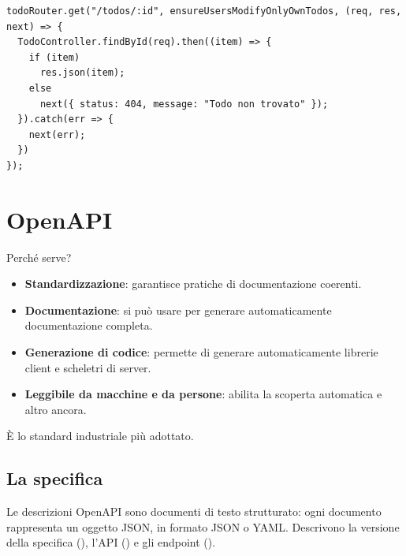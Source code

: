 \begin{lstlisting}[style=js, name=routes/todoRouter.js]
todoRouter.get("/todos/:id", ensureUsersModifyOnlyOwnTodos, (req, res, next) => {
  TodoController.findById(req).then((item) => {
    if (item)
      res.json(item);
    else
      next({ status: 404, message: "Todo non trovato" });
  }).catch(err => {
    next(err);
  })
});
\end{lstlisting}


\section{OpenAPI}


Perché serve?

\begin{itemize}
  \item \textbf{Standardizzazione}: garantisce pratiche di documentazione
        coerenti.
  \item \textbf{Documentazione}: si può usare per generare automaticamente
        documentazione completa.
  \item \textbf{Generazione di codice}: permette di generare automaticamente
        librerie client e scheletri di server.
  \item \textbf{Leggibile da macchine e da persone}: abilita la scoperta
        automatica e altro ancora.
\end{itemize}

È lo standard industriale più adottato.

\subsection{La specifica}

Le descrizioni OpenAPI sono documenti di testo strutturato: ogni documento
rappresenta un oggetto JSON, in formato JSON o YAML. Descrivono la versione
della specifica (), l'API () e gli endpoint
().

